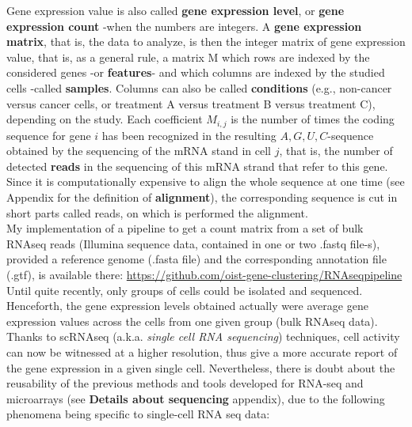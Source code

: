 \documentclass{report}
\begin{document}
Gene expression value is also called \textbf{gene expression level}, or \textbf{gene expression count} -when the numbers are integers. A \textbf{gene expression matrix}, that is, the data to analyze, is then the integer matrix of gene expression value, that is, as a general rule, a matrix M which rows are indexed by the considered genes -or \textbf{features}- and which columns are indexed by the studied cells -called \textbf{samples}. Columns can also be called \textbf{conditions} (e.g., non-cancer versus cancer cells, or treatment A versus treatment B versus treatment C), depending on the study. Each coefficient $M_{i,j}$ is the number of times the coding sequence for gene $i$ has been recognized in the resulting ${A, G, U, C}$-sequence obtained by the sequencing of the mRNA stand in cell $j$, that is, the number of detected \textbf{reads} in the sequencing of this mRNA strand that refer to this gene. Since it is computationally expensive to align the whole sequence at one time (see Appendix for the definition of \textbf{alignment}), the corresponding sequence is cut in short parts called reads, on which is performed the alignment.\\

My implementation of a pipeline to get a count matrix from a set of bulk RNAseq reads (Illumina sequence data, contained in one or two .fastq file-s), provided a reference genome (.fasta file) and the corresponding annotation file (.gtf), is available there: {\url{https://github.com/oist-gene-clustering/RNAseqpipeline}}\\ 

Until quite recently, only groups of cells could be isolated and sequenced. Henceforth, the gene expression levels obtained actually were average gene expression values across the cells from one given group (bulk RNAseq data). Thanks to scRNAseq (a.k.a. \emph{single cell RNA sequencing}) techniques, cell activity can now be witnessed at a higher resolution, thus give a more accurate report of the gene expression in a given single cell\cite{stegle2015computational}\cite{poirion2016single}. Nevertheless, there is doubt about the reusability of the previous methods and tools developed for RNA-seq and microarrays (see \textbf{Details about sequencing} appendix), due to the following phenomena being specific to single-cell RNA seq data:\\
\end{document}
